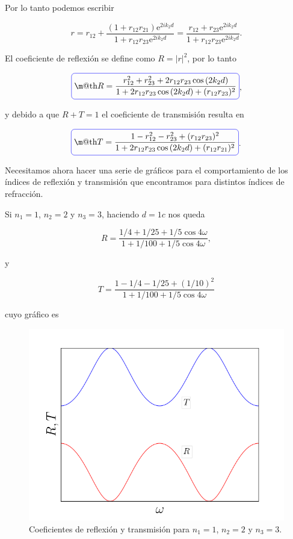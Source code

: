 \documentclass[a4paper,11pt]{article}
\makeatletter
\numberwithin{equation}{section}
\newcommand*{\boxcolor}{blue}
\renewcommand{\boxed}[1]{\textcolor{\boxcolor}{%
\tikz[baseline={([yshift=-1ex]current bounding box.center)}] \node [rectangle, minimum width=1ex,rounded corners,draw] {\normalcolor\m@th$\displaystyle#1$};}}
\newcommand{\euler}{\mathrm{e}}
\makeatother
\begin{document}
Por lo tanto podemos escribir 

\begin{equation}
 r = r_{12} + \frac{(1 + r_{12}r_{21})\euler^{2ik_2d}}{1 + r_{12}r_{23}\euler^{2ik_2d}} = 
 \frac{r_{12} + r_{23}\euler^{2ik_2d}}{1 + r_{12}r_{23}\euler^{2ik_2d}}.
\end{equation}

El coeficiente de reflexión se define como $R = |r|^2$, por lo tanto 

\begin{equation}
 \boxed{R = \frac{r_{12}^2 + r_{23}^2 + 2r_{12}r_{23}\cos{(2k_2d)}}{1 + 2r_{12}r_{23} 
 \cos{(2k_2d)} + (r_{12}r_{23})^2}},
\end{equation}

y debido a que $R + T = 1$ el coeficiente de transmisión resulta en 

\begin{equation}
 \boxed{T = \frac{1 - r_{12}^2 - r_{23}^2 + (r_{12}r_{23})^2}{1 + 2r_{12}r_{23}\cos{(2k_2d)} 
 + (r_{12}r_{21})^2}}.
\end{equation}

Necesitamos ahora hacer una serie de gráficos para el comportamiento de los índices 
de reflexión y transmisión que encontramos para distintos índices de refracción. 

\vspace{.3cm}

Si $n_1 = 1$, $n_2 = 2$ y $n_3 = 3$, haciendo $d = 1c$ nos queda 

\begin{equation}
 R = \frac{1/4 + 1/25 + 1/5\cos{4\omega}}{1 + 1/100 + 1/5\cos{4\omega}},
\end{equation}

y 

\begin{equation}
 T = \frac{1 - 1/4 - 1/25 + (1/10)^2}{1 + 1/100 + 1/5\cos{4\omega}}
\end{equation}

cuyo gráfico es 

\begin{figure}[H]
 \center 
 \includegraphics[scale=0.5]{problema1fig2}
 \caption{Coeficientes de reflexión y transmisión para $n_1 = 1$, $n_2 = 2$ y $n_3 = 3$.}
\end{figure}
\end{document}
